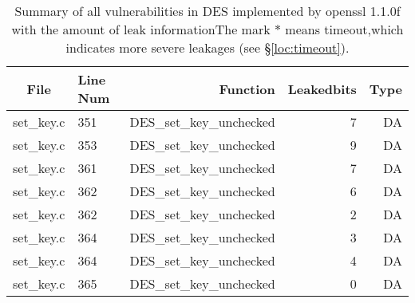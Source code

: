 \begin{table*}%
\centering
\caption{Summary of all vulnerabilities in DES implemented by openssl 1.1.0f with the amount of leak informationThe mark $*$ means timeout,which indicates more severe leakages (see \S\ref{loc:timeout}).}\label{tab:DESopenssl}
\begin{tabular}{clrrr}
\hline
\textbf{File} & \textbf{Line Num} & \textbf{Function} & \textbf{Leakedbits} & \textbf{Type} \\\hline
set\_key.c& 351&DES\_set\_key\_unchecked&7 &DA\\
set\_key.c& 353&DES\_set\_key\_unchecked&9 &DA\\
set\_key.c& 361&DES\_set\_key\_unchecked&7 &DA\\
set\_key.c& 362&DES\_set\_key\_unchecked&6 &DA\\
set\_key.c& 362&DES\_set\_key\_unchecked&2 &DA\\
set\_key.c& 364&DES\_set\_key\_unchecked&3 &DA\\
set\_key.c& 364&DES\_set\_key\_unchecked&4 &DA\\
set\_key.c& 365&DES\_set\_key\_unchecked&0 &DA\\
\hline
\end{tabular}
\end{table*}